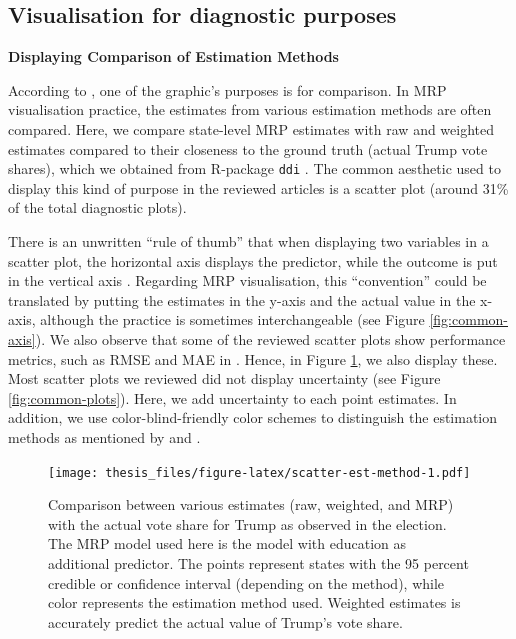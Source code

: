\documentclass{monashthesis}
\begin{document}
\hypertarget{vis-purp}{%
\subsection{Visualisation for diagnostic purposes}\label{vis-purp}}

\textbf{Displaying Comparison of Estimation Methods}

According to \textcite{tukey}, one of the graphic's purposes is for comparison. In MRP visualisation practice, the estimates from various estimation methods are often compared. Here, we compare state-level MRP estimates with raw and weighted estimates compared to their closeness to the ground truth (actual Trump vote shares), which we obtained from R-package \texttt{ddi} \autocite{ddi}. The common aesthetic used to display this kind of purpose in the reviewed articles is a scatter plot (around 31\% of the total diagnostic plots).

There is an unwritten ``rule of thumb'' that when displaying two variables in a scatter plot, the horizontal axis displays the predictor, while the outcome is put in the vertical axis \autocite{gelmanunwin}. Regarding MRP visualisation, this ``convention'' could be translated by putting the estimates in the y-axis and the actual value in the x-axis, although the practice is sometimes interchangeable (see Figure \ref{fig:common-axis}). We also observe that some of the reviewed scatter plots show performance metrics, such as RMSE and MAE in \textcite{MengXiao-Li2018Spap}. Hence, in Figure \ref{fig:scatter-est-method}, we also display these. Most scatter plots we reviewed did not display uncertainty (see Figure \ref{fig:common-plots}). Here, we add uncertainty to each point estimates. In addition, we use color-blind-friendly color schemes to distinguish the estimation methods as mentioned by \textcite{vanderplas} and \textcite{statgraph}.

\begin{figure}
\centering
\texttt{[image: thesis\_files/figure-latex/scatter-est-method-1.pdf]}
\caption{\label{fig:scatter-est-method}Comparison between various estimates (raw, weighted, and MRP) with the actual vote share for Trump as observed in the election. The MRP model used here is the model with education as additional predictor. The points represent states with the 95 percent credible or confidence interval (depending on the method), while color represents the estimation method used. Weighted estimates is accurately predict the actual value of Trump's vote share.}
\end{figure}
\end{document}
